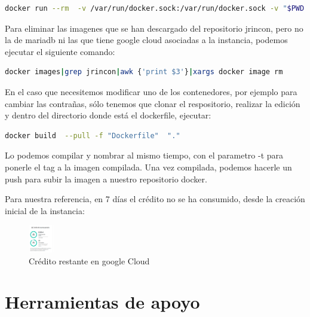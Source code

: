 \documentclass[11pt,spanish,listoffigures,listoftables]{tfgetsinf}
\begin{document}
\begin{lstlisting}[language=bash, caption={Comando docker para parar docker-compose}]
docker run --rm  -v /var/run/docker.sock:/var/run/docker.sock -v "$PWD:$PWD"   -w="$PWD"  docker/compose:1.24.0 down
\end{lstlisting}

Para eliminar las imagenes que se han descargado del repositorio jrincon, pero no la de mariadb ni las que tiene google cloud asociadas a la instancia, podemos ejecutar el siguiente comando:

\begin{lstlisting}[language=bash, caption={Borrado de imágenes con el texto jrincon}]
  docker images|grep jrincon|awk {'print $3'}|xargs docker image rm
\end{lstlisting}

En el caso que necesitemos modificar uno de los contenedores, por ejemplo para cambiar las contrañas, sólo tenemos que clonar el respositorio, realizar la edición y dentro del directorio donde está el dockerfile, ejecutar:

\begin{lstlisting}[language=bash, caption={Comando docker para construir una imagen}]
  docker build  --pull -f "Dockerfile"  "."
\end{lstlisting}

Lo podemos compilar y nombrar al mismo tiempo, con el parametro -t para ponerle el tag a la imagen compilada. Una vez compilada, podemos hacerle un push para subir la imagen a nuestro repositorio docker.

Para nuestra referencia, en 7 días el crédito no se ha consumido, desde la creación inicial de la instancia:

\begin{figure}[h!] %
  \centering
   \includegraphics[width=0.10\textwidth]{img/Credito.png}
   \caption{Crédito restante en google Cloud}
   \label{fig:creditogoogle}
 \end{figure}

\chapter{Herramientas de apoyo}
\end{document}
